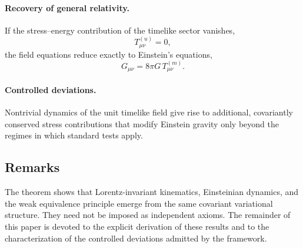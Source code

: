 \documentclass[11pt]{article}
\begin{document}
            \paragraph{Recovery of general relativity.}
                If the stress--energy contribution of the timelike sector vanishes,
            \begin{equation}
                T^{(u)}_{\mu\nu} = 0,
                \end{equation}
                the field equations reduce exactly to Einstein’s equations,
            \begin{equation}
                G_{\mu\nu} = 8\pi G\,T^{(m)}_{\mu\nu}.
                \end{equation}

            \paragraph{Controlled deviations.}
                Nontrivial dynamics of the unit timelike field give rise to additional,
                covariantly conserved stress contributions that modify Einstein gravity only
                beyond the regimes in which standard tests apply.

    \subsection{Remarks}

        The theorem shows that Lorentz-invariant kinematics, Einsteinian dynamics, and
        the weak equivalence principle emerge from the same covariant variational
        structure.
        They need not be imposed as independent axioms.
        The remainder of this paper is devoted to the explicit derivation of these
        results and to the characterization of the controlled deviations admitted by
        the framework.
\end{document}
